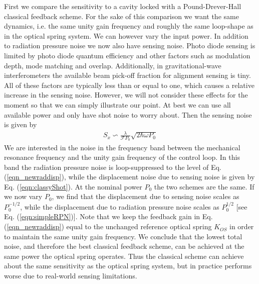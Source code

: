 First we compare the sensitivity to a cavity locked with a Pound-Drever-Hall classical feedback scheme. For the sake of this comparison we want the same dynamics, i.e. the same unity gain frequency and roughly the same loop-shape as in the optical spring system. We can however vary the input power. In addition to radiation pressure noise
we now also have sensing noise.
Photo diode sensing is limited by photo diode quantum efficiency and other factors such as modulation depth, mode matching and overlap. Additionally, in gravitational-wave interferometers the available beam pick-off fraction for alignment sensing is tiny.
All of these factors are typically less than or equal to one, which causes a relative increase in the sensing noise. However, we will not consider these effects for the moment so that we can simply illustrate our point. At best we can use all available power and only have shot noise to worry about. Then the sensing noise is given by
\begin{align}
\label{eqn:classyShot}
S_x \backsim \frac{\lambda}{\mathcal{F} P_0}\sqrt{2 \hbar \omega P_0}
\end{align}
We are interested in the noise in the frequency band between the mechanical resonance frequency and the unity gain frequency of the control loop. In this band the radiation pressure noise is loop-suppressed to the level of Eq. (\ref{eqn_newraddisp}), while the displacement noise due to sensing noise is given by Eq. (\ref{eqn:classyShot}). At the nominal power $P_0$ the two schemes are the same. If we now vary $P_0$, we find that the displacement due to sensing noise scales as $P_0^{-1/2}$, while the displacement due to radiation pressure noise scales as $P_0^{1/2}$ [see Eq. (\ref{eqn:simpleRPN})]. Note that we keep the feedback gain in Eq. (\ref{eqn_newraddisp}) equal to the unchanged reference optical spring $K_{OS}$ in order to maintain the same unity gain frequency. We conclude that the lowest total noise, and therefore the best classical feedback scheme, can be achieved at the same power the optical spring operates. Thus the classical scheme can achieve about the same sensitivity as the optical spring system, but in practice performs worse due to real-world sensing limitations.


